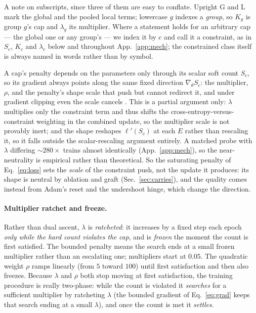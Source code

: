 \documentclass[10pt]{article}
\begin{document}
{\color{blue}A note on subscripts, since three of them are easy to conflate.
Upright $\mathrm{G}$ and $\mathrm{L}$ mark the global and the pooled local terms;
lowercase $g$ indexes a \emph{group}, so $K_g$ is group $g$'s cap and
$\lambda_g$ its multiplier. Where a statement holds for an arbitrary cap --- the
global one or any group's --- we index it by $c$ and call it a constraint, as in
$S_c$, $K_c$ and $\lambda_c$ below and throughout App.~\ref{app:mech}; the
constrained class itself is always named in words rather than by symbol.}

A cap's penalty depends on the parameters only through its scalar soft count
$S_c$, so its gradient always points along the same fixed direction
$\nabla_\theta S_c$: the multiplier, $\rho$, and the penalty's shape scale
that push but cannot redirect it, and under gradient clipping even the scale
cancels \citep{pascanu2013difficulty}. This is a partial argument only:
$\lambda$ multiplies only the constraint term and thus shifts the
cross-entropy-versus-constraint weighting in the combined update, so the
multiplier scale is not provably inert; and the shape reshapes $\ell'(S_c)$
at each $E$ rather than rescaling it, so it falls outside the scalar-rescaling
argument entirely. A matched probe with $\lambda$ differing ${\sim}280\times$
trains almost identically (App.~\ref{app:mech}), so the near-neutrality is
empirical rather than theoretical. So the saturating penalty of
Eq.~\eqref{eq:loss} sets the \emph{scale} of the constraint push, not the
update it produces: its shape is neutral by ablation and graft
(Sec.~\ref{sec:carries}), and the quality comes instead from Adam's reset
and the undershoot hinge, which change the direction.

\paragraph{Multiplier ratchet and freeze.}
Rather than dual ascent, $\lambda$ is \emph{ratcheted}: it increases by a
fixed step each epoch \emph{only while the hard count violates the cap}, and
is \emph{frozen} the moment the count is first satisfied. The bounded
penalty means the search ends at a small frozen multiplier rather than an
escalating one; multipliers start at $0.05$. The quadratic weight $\rho$
ramps linearly (from $5$ toward $100$) until first satisfaction and then
also freezes. Because $\lambda$ and $\rho$ both stop moving at first
satisfaction, the training procedure is really two-phase: while the count
is violated it \emph{searches} for a sufficient multiplier by ratcheting
$\lambda$ (the bounded gradient of Eq.~\eqref{eq:grad} keeps that search
ending at a small $\lambda$), and once the count is met it \emph{settles}.
\end{document}
